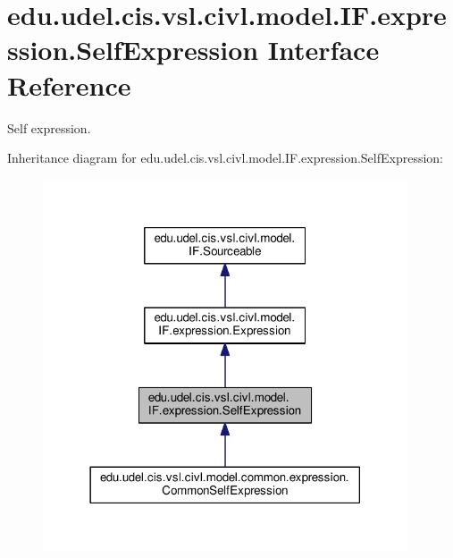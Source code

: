\hypertarget{interfaceedu_1_1udel_1_1cis_1_1vsl_1_1civl_1_1model_1_1IF_1_1expression_1_1SelfExpression}{}\section{edu.\+udel.\+cis.\+vsl.\+civl.\+model.\+I\+F.\+expression.\+Self\+Expression Interface Reference}
\label{interfaceedu_1_1udel_1_1cis_1_1vsl_1_1civl_1_1model_1_1IF_1_1expression_1_1SelfExpression}


Self expression.  




Inheritance diagram for edu.\+udel.\+cis.\+vsl.\+civl.\+model.\+I\+F.\+expression.\+Self\+Expression\+:
\nopagebreak
\begin{figure}[H]
\begin{center}
\leavevmode
\includegraphics[width=306pt]{interfaceedu_1_1udel_1_1cis_1_1vsl_1_1civl_1_1model_1_1IF_1_1expression_1_1SelfExpression__inherit__graph}
\end{center}
\end{figure}


